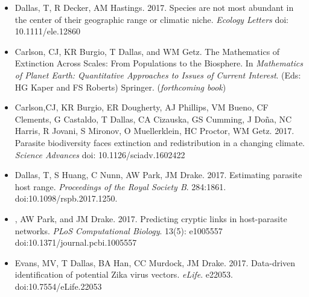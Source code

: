\documentclass[]{CV}
\begin{document}
{}
\begin{itemize}

\item {\mefont Dallas, T}, R Decker, AM Hastings. 2017. Species are not most abundant in the center of their geographic range or climatic niche. \textit{Ecology Letters} doi: 10.1111/ele.12860

\item Carlson, CJ, KR Burgio, {\mefont T Dallas}, and WM Getz. The Mathematics of Extinction Across Scales: From Populations to the Biosphere. In \textit{Mathematics of Planet Earth: Quantitative Approaches to Issues of Current Interest}. (Eds: HG Kaper and FS Roberts) Springer. (\textit{forthcoming book})

\item \OA Carlson,CJ, KR Burgio, ER Dougherty, AJ Phillips, VM Bueno, CF Clements, G Castaldo, {\mefont T Dallas}, CA Cizauska, GS Cumming, J Do\~na, NC Harris, R Jovani, S Mironov, O Muellerklein, HC Proctor, WM Getz. 2017. Parasite biodiversity faces extinction and redistribution in a changing climate. \textit{Science Advances} doi: 10.1126/sciadv.1602422

\item {\mefont Dallas, T}, S Huang, C Nunn, AW Park, JM Drake. 2017. Estimating parasite host range. \textit{Proceedings of the Royal Society B}. 284:1861. doi:10.1098/rspb.2017.1250.

\item {}, AW Park, and JM Drake. 2017. Predicting cryptic links in host-parasite networks. \textit{PLoS Computational Biology}. 13(5): e1005557 doi:10.1371/journal.pcbi.1005557

\item \OA Evans, MV, {\mefont T Dallas}, BA Han, CC Murdock, JM Drake. 2017. Data-driven identification of potential Zika virus vectors. \textit{eLife}. e22053. doi:10.7554/eLife.22053

\end{itemize}
\end{document}
